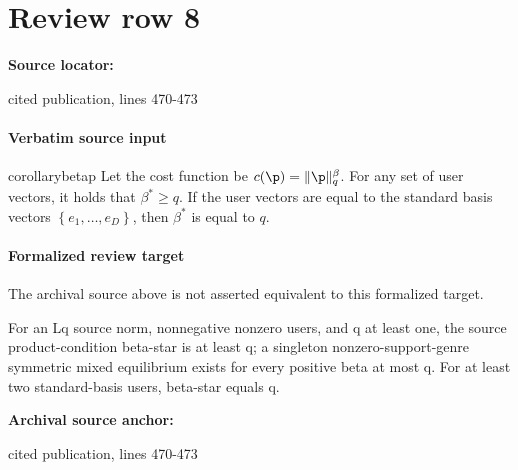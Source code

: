 \documentclass[10pt]{article}
\begin{document}
\section*{Review row 8}
\textbf{Source locator:} {\footnotesize\raggedright cited publication, lines 470-\allowbreak{}473\par}
\paragraph{Verbatim source input}
\begin{ReviewVerbatim}
\begin{restatable}{corollary}{betap}
\label{cor:betap}
Let the cost function be $c(\p) = \|\p\|_{q}^{\beta}$. For any set of user vectors, it holds that $\beta^* \ge q$. If the user vectors are equal to the standard basis vectors $\left\{e_1, \ldots, e_D \right\}$, then $\beta^*$ is equal to $q$.
\end{restatable}
\end{ReviewVerbatim}


\paragraph{Formalized review target}
The archival source above is not asserted equivalent to this formalized target.
\begin{ReviewVerbatim}
For an Lq source norm, nonnegative nonzero users, and q at least one, the source product-condition beta-star is at least q; a singleton nonzero-support-genre symmetric mixed equilibrium exists for every positive beta at most q. For at least two standard-basis users, beta-star equals q.
\end{ReviewVerbatim}

\textbf{Archival source anchor:} {\footnotesize\raggedright cited publication, lines 470-\allowbreak{}473\par}
\end{document}
